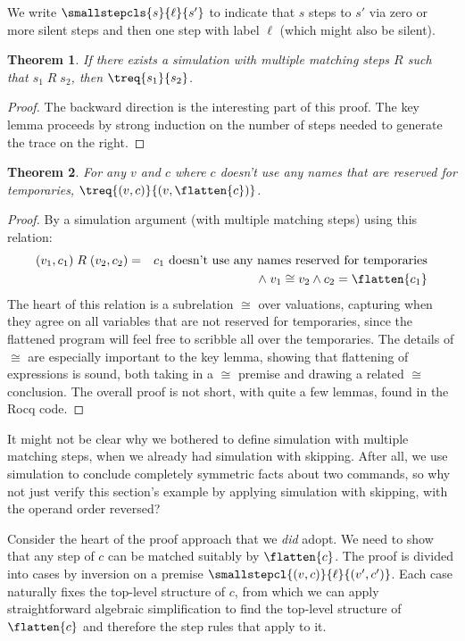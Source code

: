 \documentclass{amsbook}
\newtheorem{theorem}{Theorem}[chapter]
\theoremstyle{definition}
\theoremstyle{remark}
\numberwithin{section}{chapter}
\numberwithin{equation}{chapter}
\begin{document}
We write $\smallstepcls{s}{\ell}{s'}$ to indicate that $s$ steps to $s'$ via zero or more silent steps and then one step with label $\ell$ (which might also be silent).

\begin{theorem}
  If there exists a simulation with multiple matching steps $R$ such that $s_1 \; R \; s_2$, then $\treq{s_1}{s_2}$.
\end{theorem}
\begin{proof}
  The backward direction is the interesting part of this proof.
  The key lemma proceeds by strong induction on the number of steps needed to generate the trace on the right.
\end{proof}

\begin{theorem}
  For any $v$ and $c$ where $c$ doesn't use any names that are reserved for temporaries, $\treq{(v, c)}{(v, \flatten{c})}$.
\end{theorem}
\begin{proof}
  By a simulation argument (with multiple matching steps) using this relation:
  \begin{eqnarray*}
    (v_1, c_1) \; R \; (v_2, c_2) &=& \textrm{$c_1$ doesn't use any names reserved for temporaries} \\
    && \land \; v_1 \cong v_2 \land c_2 = \flatten{c_1}
  \end{eqnarray*}
  The heart of this relation is a subrelation $\cong$ over valuations, capturing when they agree on all variables that are not reserved for temporaries, since the flattened program will feel free to scribble all over the temporaries.
  The details of $\cong$ are especially important to the key lemma, showing that flattening of expressions is sound, both taking in a $\cong$ premise and drawing a related $\cong$ conclusion.
  The overall proof is not short, with quite a few lemmas, found in the Rocq code.
\end{proof}

\medskip

It might not be clear why we bothered to define simulation with multiple matching steps, when we already had simulation with skipping.
After all, we use simulation to conclude completely symmetric facts about two commands, so why not just verify this section's example by applying simulation with skipping, with the operand order reversed?

Consider the heart of the proof approach that we \emph{did} adopt.
We need to show that any step of $c$ can be matched suitably by $\flatten{c}$.
The proof is divided into cases by inversion on a premise $\smallstepcl{(v, c)}{\ell}{(v', c')}$.
Each case naturally fixes the top-level structure of $c$, from which we can apply straightforward algebraic simplification to find the top-level structure of $\flatten{c}$ and therefore the step rules that apply to it.
\end{document}
